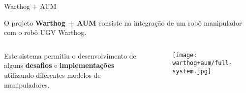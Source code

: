 \begin{frame}[c]{} 
   
    \begin{center}
    \end{center}
       
\end{frame}
%
\begin{frame}[t]{Warthog + AUM} 

    O projeto \textbf{Warthog + AUM} consiste na integração de um robô manipulador com o robô UGV Warthog.

    \vspace*{0.3cm}
        \begin{columns}[t]
            \begin{center}
                Este sistema permitiu o desenvolvimento de alguns \textbf{desafios} e \textbf{implementações} utilizando diferentes modelos de manipuladores.
            \end{center}
            \begin{center}
                \begin{figure}
                    \texttt{[image: warthog+aum/full-system.jpg]}
                \end{figure}
            \end{center}
        \end{columns}
\end{frame}

